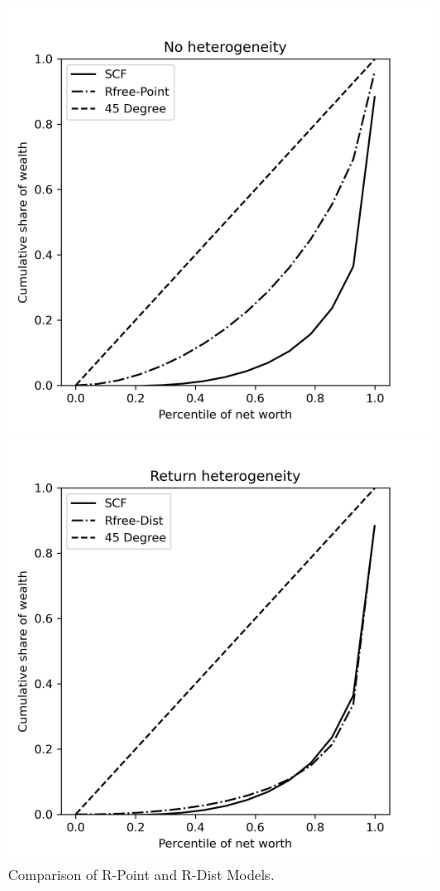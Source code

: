 \begin{figure}[h]
    \centering
    \begin{minipage}{0.48\textwidth}
        \centering
        \includegraphics[width=\textwidth]{../Figures/Unif_PYrrPointNetWorth_2004Plot.png}
    \end{minipage}
    \hfill
    \begin{minipage}{0.48\textwidth}
        \centering
        \includegraphics[width=\textwidth]{../Figures/Unif_PYrrDistNetWorth_2004Plot.png}
    \end{minipage}
    \caption{Comparison of R-Point and R-Dist Models.}
    \label{fig:PYUnif} 
\end{figure}

